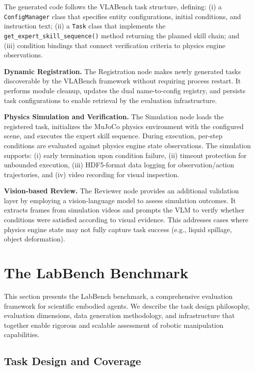 \documentclass[letterpaper]{article} %
\begin{document}
The generated code follows the VLABench task structure, defining: (i) a \texttt{ConfigManager} class that specifies entity configurations, initial conditions, and instruction text; (ii) a \texttt{Task} class that implements the \texttt{get\_expert\_skill\_sequence()} method returning the planned skill chain; and (iii) condition bindings that connect verification criteria to physics engine observations.

\textbf{Dynamic Registration.} The Registration node makes newly generated tasks discoverable by the VLABench framework without requiring process restart. It performs module cleanup, updates the dual name-to-config registry, and persists task configurations to enable retrieval by the evaluation infrastructure.

\textbf{Physics Simulation and Verification.} The Simulation node loads the registered task, initializes the MuJoCo physics environment with the configured scene, and executes the expert skill sequence. During execution, per-step conditions are evaluated against physics engine state observations. The simulation supports: (i) early termination upon condition failure, (ii) timeout protection for unbounded execution, (iii) HDF5-format data logging for observation/action trajectories, and (iv) video recording for visual inspection.

\textbf{Vision-based Review.} The Reviewer node provides an additional validation layer by employing a vision-language model to assess simulation outcomes. It extracts frames from simulation videos and prompts the VLM to verify whether conditions were satisfied according to visual evidence. This addresses cases where physics engine state may not fully capture task success (e.g., liquid spillage, object deformation).

\section{The LabBench Benchmark}
\label{sec:benchmark}

This section presents the LabBench benchmark, a comprehensive evaluation framework for scientific embodied agents. We describe the task design philosophy, evaluation dimensions, data generation methodology, and infrastructure that together enable rigorous and scalable assessment of robotic manipulation capabilities.

\subsection{Task Design and Coverage}
\end{document}
